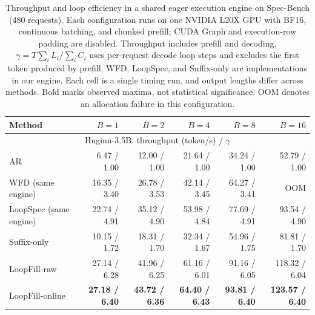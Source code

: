 \begin{table}[t]
\centering
\small
\begin{tabular}{lrrrrr}
\toprule
Method & $B=1$ & $B=2$ & $B=4$ & $B=8$ & $B=16$ \\
\midrule
\multicolumn{6}{c}{Huginn-3.5B: throughput (token/s) / $\gamma$} \\
\midrule
AR & 6.47 / 1.00 & 12.00 / 1.00 & 21.64 / 1.00 & 34.24 / 1.00 & 52.79 / 1.00 \\
WFD (same engine) & 16.35 / 3.40 & 26.78 / 3.53 & 42.14 / 3.45 & 64.27 / 3.41 & OOM \\
LoopSpec (same engine) & 22.74 / 4.91 & 35.12 / 4.90 & 53.98 / 4.84 & 77.69 / 4.91 & 93.54 / 4.90 \\
Suffix-only & 10.15 / 1.72 & 18.31 / 1.70 & 32.34 / 1.67 & 54.96 / 1.75 & 81.81 / 1.70 \\
LoopFill-raw & 27.14 / 6.28 & 41.96 / 6.25 & 61.16 / 6.01 & 91.16 / 6.05 & 118.32 / 6.04 \\
LoopFill-online & \textbf{27.18 / 6.40} & \textbf{43.72 / 6.36} & \textbf{64.40 / 6.43} & \textbf{93.81 / 6.40} & \textbf{123.57 / 6.40} \\
\bottomrule
\end{tabular}
\caption{Throughput and loop efficiency in a shared eager execution engine on Spec-Bench (480 requests). Each configuration runs on one NVIDIA L20X GPU with BF16, continuous batching, and chunked prefill; CUDA Graph and execution-row padding are disabled. Throughput includes prefill and decoding. $\gamma=T\sum_i L_i/\sum_i C_i$ uses per-request decode loop steps and excludes the first token produced by prefill. WFD, LoopSpec, and Suffix-only are implementations in our engine. Each cell is a single timing run, and output lengths differ across methods. Bold marks observed maxima, not statistical significance. OOM denotes an allocation failure in this configuration.}
\label{tab:loopfill-eager-huginn}
\end{table}
